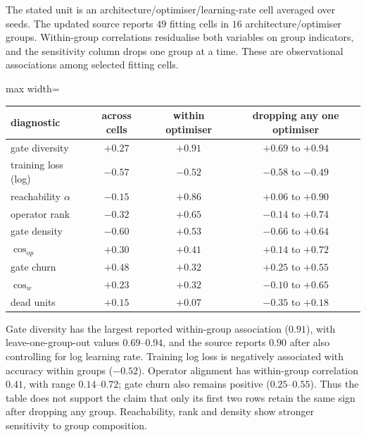 \documentclass{article}
\theoremstyle{definition}
\theoremstyle{remark}
\begin{document}
The stated unit is an architecture/optimiser/learning-rate cell averaged over seeds. The updated source reports $49$ fitting cells in $16$ architecture/optimiser groups. Within-group correlations residualise both variables on group indicators, and the sensitivity column drops one group at a time. These are observational associations among selected fitting cells.

\begin{center}\small
\begin{adjustbox}{max width=\linewidth}
\begin{tabular}{lccc}
\toprule
diagnostic & across cells & within optimiser & dropping any one optimiser \\
\midrule
gate diversity        & $+0.27$ & $\mathbf{+0.91}$ & $+0.69$ to $+0.94$ \\
training loss (log)   & $-0.57$ & $-0.52$ & $-0.58$ to $-0.49$ \\
\midrule
reachability $\alpha$ & $-0.15$ & $+0.86$ & $+0.06$ to $+0.90$ \\
operator rank         & $-0.32$ & $+0.65$ & $-0.14$ to $+0.74$ \\
gate density          & $-0.60$ & $+0.53$ & $-0.66$ to $+0.64$ \\
$\cos_{op}$           & $+0.30$ & $+0.41$ & $+0.14$ to $+0.72$ \\
gate churn            & $+0.48$ & $+0.32$ & $+0.25$ to $+0.55$ \\
$\cos_w$              & $+0.23$ & $+0.32$ & $-0.10$ to $+0.65$ \\
dead units            & $+0.15$ & $+0.07$ & $-0.35$ to $+0.18$ \\
\bottomrule
\end{tabular}
\end{adjustbox}
\end{center}

Gate diversity has the largest reported within-group association ($0.91$), with leave-one-group-out values $0.69$--$0.94$, and the source reports $0.90$ after also controlling for log learning rate. Training log loss is negatively associated with accuracy within groups ($-0.52$). Operator alignment has within-group correlation $0.41$, with range $0.14$--$0.72$; gate churn also remains positive ($0.25$--$0.55$). Thus the table does not support the claim that only its first two rows retain the same sign after dropping any group. Reachability, rank and density show stronger sensitivity to group composition.
\end{document}

